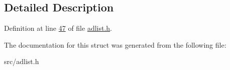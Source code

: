 \subsection{Detailed Description}


Definition at line \hyperlink{adlist_8h_source_l00047}{47} of file \hyperlink{adlist_8h_source}{adlist.\+h}.



The documentation for this struct was generated from the following file\+:\begin{DoxyCompactItemize}
\item 
src/adlist.\+h\end{DoxyCompactItemize}
